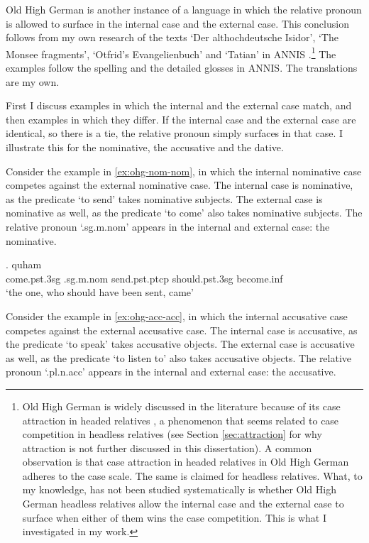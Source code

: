 Old High German is another instance of a language in which the relative pronoun is allowed to surface in the internal case and the external case. This conclusion follows from my own research of the texts `Der althochdeutsche Isidor', `The Monsee fragments', `Otfrid's Evangelienbuch' and `Tatian' in ANNIS \citep{krause2016}.\footnote{
Old High German is widely discussed in the literature because of its case attraction in headed relatives \citep[cf.][]{pittner1995}, a phenomenon that seems related to case competition in headless relatives (see Section \ref{sec:attraction} for why attraction is not further discussed in this dissertation).
A common observation is that case attraction in headed relatives in Old High German adheres to the case scale. The same is claimed for headless relatives.
What, to my knowledge, has not been studied systematically is whether Old High German headless relatives allow the internal case and the external case to surface when either of them wins the case competition. This is what I investigated in my work.
}
The examples follow the spelling and the detailed glosses in ANNIS. The translations are my own.

First I discuss examples in which the internal and the external case match, and then examples in which they differ. If the internal case and the external case are identical, so there is a tie, the relative pronoun simply surfaces in that case. I illustrate this for the nominative, the accusative and the dative.

Consider the example in \ref{ex:ohg-nom-nom}, in which the internal nominative case competes against the external nominative case.
The internal case is nominative, as the predicate  `to send' takes nominative subjects.
The external case is nominative as well, as the predicate  `to come' also takes nominative subjects.
The relative pronoun  `.\ac{sg}.\ac{m}.\ac{nom}' appears in the internal and external case: the nominative.

\exg. quham    \\
 come.\ac{pst}.3\ac{sg}\scsub{[nom]} .\ac{sg}.\ac{m}.\ac{nom} send.\ac{pst}.\ac{ptcp}\scsub{[nom]} should.\ac{pst}.3\ac{sg} become.\ac{inf}\\
 `the one, who should have been sent, came' \label{ex:ohg-nom-nom}

Consider the example in \ref{ex:ohg-acc-acc}, in which the internal accusative case competes against the external accusative case.
The internal case is accusative, as the predicate  `to speak' takes accusative objects.
The external case is accusative as well, as the predicate  `to listen to' also takes accusative objects.
The relative pronoun  `.\ac{pl}.\ac{n}.\ac{acc}' appears in the internal and external case: the accusative.

